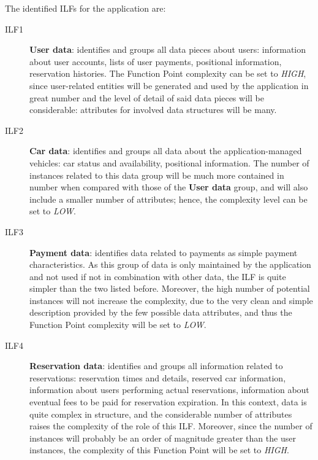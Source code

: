The identified ILFs for the application are:
\begin{description}
\item[ILF1] \textbf{User data}: identifies and groups all data pieces about users: information about user accounts, lists of user payments, positional information, reservation histories. The Function Point complexity can be set to \textit{HIGH}, since user-related entities will be generated and used by the application in great number and the level of detail of said data pieces will be considerable: attributes for involved data structures will be many.
\item[ILF2] \textbf{Car data}:	identifies and groups all data about the application-managed vehicles: car status and availability, positional information. The number of instances related to this data group will be much more contained in number when compared with those of the \textbf{User data} group, and will also include a smaller number of attributes; hence, the complexity level can be set to \textit{LOW}.
\item[ILF3] \textbf{Payment data}: identifies data related to payments as simple payment characteristics. As this group of data is only maintained by the application and not used if not in combination with other data, the ILF is quite simpler than the two listed before. Moreover, the high number of potential instances will not increase the complexity, due to the very clean and simple description provided by the few possible data attributes, and thus the Function Point complexity will be set to \textit{LOW}.
\item[ILF4] \textbf{Reservation data}: identifies and groups all information related to reservations: reservation times and details, reserved car information, information about users performing actual reservations, information about eventual fees to be paid for reservation expiration. In this context, data is quite complex in structure, and the considerable number of attributes raises the complexity of the role of this ILF. Moreover, since the number of instances will probably be an order of magnitude greater than the user instances, the complexity of this Function Point will be set to \textit{HIGH}.

\end{description}

